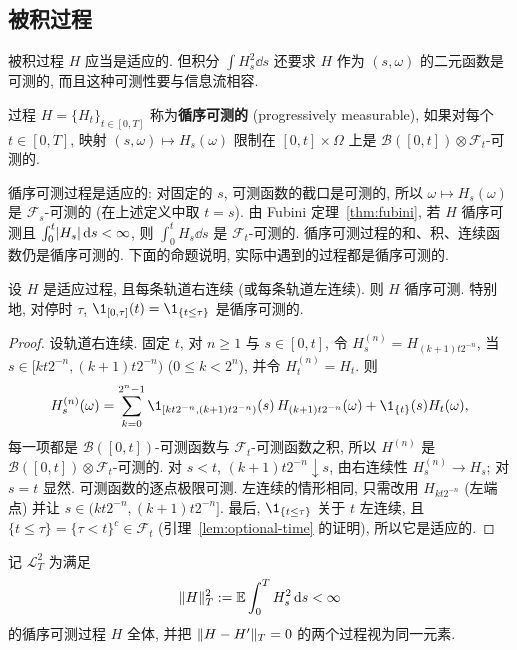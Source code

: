 \subsection{被积过程}

被积过程 $H$ 应当是适应的. 但积分 $\int H_s^2\dd s$ 还要求 $H$ 作为 $(s,\omega)$ 的二元函数是可测的, 而且这种可测性要与信息流相容.

\begin{definition}[循序可测]\label{def:progressive}
过程 $H=\{H_t\}_{t\in[0,T]}$ 称为\textbf{循序可测的} (progressively measurable), 如果对每个 $t\in[0,T]$, 映射 $(s,\omega)\mapsto H_s(\omega)$ 限制在 $[0,t]\times\Omega$ 上是 $\mathcal{B}([0,t])\otimes\mathcal{F}_t$-可测的.
\end{definition}

循序可测过程是适应的: 对固定的 $s$, 可测函数的截口是可测的, 所以 $\omega\mapsto H_s(\omega)$ 是 $\mathcal{F}_s$-可测的 (在上述定义中取 $t=s$). 由 Fubini 定理~\ref{thm:fubini}, 若 $H$ 循序可测且 $\int_0^t\lvert H_s\rvert\mathop{}\!\mathrm{d} s<\infty$, 则 $\int_0^tH_s\dd s$ 是 $\mathcal{F}_t$-可测的. 循序可测过程的和、积、连续函数仍是循序可测的. 下面的命题说明, 实际中遇到的过程都是循序可测的.

\begin{proposition}\label{prop:progressive}
设 $H$ 是适应过程, 且每条轨道右连续 (或每条轨道左连续). 则 $H$ 循序可测. 特别地, 对停时 $\tau$, $\1_{[0,\tau]}(t)=\1_{\{t\le\tau\}}$ 是循序可测的.
\end{proposition}

\begin{proof}
设轨道右连续. 固定 $t$, 对 $n\ge1$ 与 $s\in[0,t]$, 令 $H^{(n)}_s=H_{(k+1)t2^{-n}}$, 当 $s\in[kt2^{-n},(k+1)t2^{-n})$ ($0\le k<2^n$), 并令 $H^{(n)}_t=H_t$. 则
\[
H^{(n)}_s(\omega)=\sum_{k=0}^{2^n-1}\1_{[kt2^{-n},(k+1)t2^{-n})}(s)\,H_{(k+1)t2^{-n}}(\omega)+\1_{\{t\}}(s)H_t(\omega),
\]
每一项都是 $\mathcal{B}([0,t])$-可测函数与 $\mathcal{F}_t$-可测函数之积, 所以 $H^{(n)}$ 是 $\mathcal{B}([0,t])\otimes\mathcal{F}_t$-可测的. 对 $s<t$, $(k+1)t2^{-n}\downarrow s$, 由右连续性 $H^{(n)}_s\to H_s$; 对 $s=t$ 显然. 可测函数的逐点极限可测. 左连续的情形相同, 只需改用 $H_{kt2^{-n}}$ (左端点) 并让 $s\in(kt2^{-n},(k+1)t2^{-n}]$. 最后, $\1_{\{t\le\tau\}}$ 关于 $t$ 左连续, 且 $\{t\le\tau\}=\{\tau<t\}^c\in\mathcal{F}_t$ (引理~\ref{lem:optional-time} 的证明), 所以它是适应的.
\end{proof}

\begin{definition}[被积过程空间]\label{def:L2-integrands}
记 $\mathscr{L}^2_T$ 为满足
\[
\lVert H\rVert_T^2:=\mathbb{E}\int_0^TH_s^2\mathop{}\!\mathrm{d} s<\infty
\]
的循序可测过程 $H$ 全体, 并把 $\lVert H-H'\rVert_T=0$ 的两个过程视为同一元素.
\end{definition}

